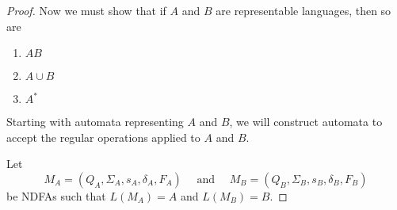 \documentclass{bcthesis}
\begin{document}
\begin{proof}
		Now we must show that if $A$ and $B$ are representable languages, then so are
		\begin{enumerate}[label=(\roman*), itemsep = -0.3 ex, nolistsep]
			\item $AB$
			\item $A \cup B$
			\item $A^*$
		\end{enumerate}
		Starting with automata representing $A$ and $B$, we will construct automata to accept the regular operations applied to $A$ and $B$.

			\newcommand{\ma}{\ensuremath{M_A}\xspace}
				\newcommand{\qa}{\ensuremath{Q_A}\xspace}
				\newcommand{\siga}{\ensuremath{\Sigma_A}\xspace}
				\newcommand{\sa}{\ensuremath{s_A}\xspace}
				\newcommand{\dala}{\ensuremath{\delta_A}\xspace}
				\newcommand{\fa}{\ensuremath{F_A}\xspace}

			\newcommand{\mb}{\ensuremath{M_B}\xspace}
				\newcommand{\qb}{\ensuremath{Q_B}\xspace}
				\newcommand{\sigb}{\ensuremath{\Sigma_B}\xspace}
				\renewcommand{\sb}{\ensuremath{s_B}\xspace}
				\newcommand{\dalb}{\ensuremath{\delta_B}\xspace}
				\newcommand{\fb}{\ensuremath{F_B}\xspace}

			\newcommand{\mab}{\ensuremath{M_{AB}}\xspace}
				\newcommand{\qab}{\ensuremath{Q_{AB}}\xspace}
				\newcommand{\sigab}{\ensuremath{\Sigma_{AB}}\xspace}
				\newcommand{\sab}{\ensuremath{s_{AB}}\xspace}
				\newcommand{\dalab}{\ensuremath{\delta_{AB}}\xspace}
				\newcommand{\fab}{\ensuremath{F_{AB}}\xspace}

			\newcommand{\maub}{\ensuremath{M_{A \cup B}}\xspace}
				\newcommand{\qaub}{\ensuremath{Q_{A \cup B}}\xspace}
				\newcommand{\sigaub}{\ensuremath{\Sigma_{A \cup B}}\xspace}
				\newcommand{\saub}{\ensuremath{s_{A \cup B}}\xspace}
				\newcommand{\dalaub}{\ensuremath{\delta_{A \cup B}}\xspace}
				\newcommand{\faub}{\ensuremath{F_{A \cup B}}\xspace}

			\newcommand{\mas}{\ensuremath{M_{A^*}}\xspace}
				\newcommand{\qas}{\ensuremath{Q_{A^*}}\xspace}
				\newcommand{\sigas}{\ensuremath{\Sigma_{A^*}}\xspace}
				\newcommand{\sas}{\ensuremath{s_{A^*}}\xspace}
				\newcommand{\dalas}{\ensuremath{\delta_{A^*}}\xspace}
				\newcommand{\fas}{\ensuremath{F_{A^*}}\xspace}


		Let 
		\[
			M_A = (Q_A, \Sigma_A, s_A, \delta_A, F_A) \quad \text{ and } \quad M_B = (Q_B, \Sigma_B, s_B, \delta_B, F_B)
		\]
		be NDFAs such that $L(\ma) = A$ and $L(\mb) = B$.


\end{proof}
\end{document}
